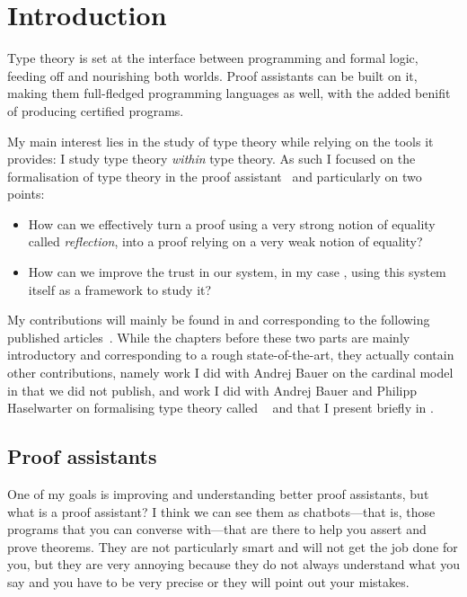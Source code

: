 \chapter{Introduction}

Type theory is set at the interface between programming and formal logic,
feeding off and nourishing both worlds. Proof assistants can be built on it,
making them full-fledged programming languages as well, with the added benifit
of producing certified programs.

My main interest lies in the study of type theory while relying on the tools it
provides: I study type theory \emph{within} type theory.
As such I focused on the formalisation of type theory in the \Coq proof
assistant~ and particularly on two points:
\begin{itemize}
  \item How can we effectively turn a proof using a very strong notion of
  equality called \emph{reflection}, into a proof relying on a very weak notion
  of equality?
  \item How can we improve the trust in our system, in my case \Coq, using this
  system itself as a framework to study it?
\end{itemize}

My contributions will mainly be found in  and
 corresponding to the following published
articles~.
While the chapters before these two parts are mainly introductory and
corresponding to a rough state-of-the-art, they actually contain other
contributions, namely work I did with Andrej Bauer on the cardinal model
in  that we did not publish, and work I did with Andrej Bauer
and Philipp Haselwarter on formalising type theory called
\ftt~ and that I present briefly in
.

\section{Proof assistants}

One of my goals is improving and understanding better proof assistants, but what
is a proof assistant?
I think we can see them as chatbots---that is, those programs that you can
converse with---that are there to help you assert and prove theorems.
They are not particularly smart and will not get the job done for you, but they
are very annoying because they do not always understand what you say and you
have to be very precise or they will point out your mistakes.

